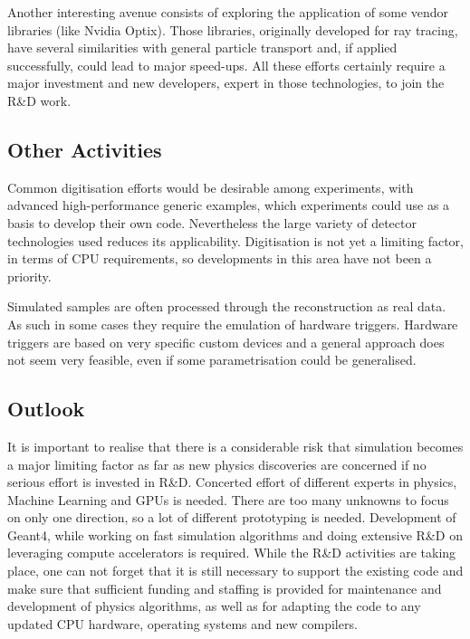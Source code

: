 Another interesting avenue consists of
exploring the application of some vendor libraries (like Nvidia Optix).
Those libraries, originally developed for ray tracing, have several
similarities with general particle transport and, if applied
successfully, could lead to major speed-ups. All these efforts certainly
require a major investment and new developers, expert in those
technologies, to join the R\&D work.

\hypertarget{other-activities}{%
\subsection{Other Activities}\label{other-activities}}

Common digitisation efforts would be desirable among experiments, with
advanced high-performance generic examples, which experiments could use
as a basis to develop their own code. Nevertheless the large variety of
detector technologies used reduces its
applicability. Digitisation is not yet a limiting factor, in terms of
CPU requirements, so developments in this area have not been a priority.

Simulated samples are often processed through the reconstruction as real
data. As such in some cases they require the emulation of hardware
triggers. Hardware triggers are based on very specific custom devices
and a general approach does not seem very feasible, even if some
parametrisation could be generalised.

\hypertarget{outlook}{%
\subsection{Outlook}\label{outlook}}

It is important to realise that there is a considerable
risk that simulation becomes a major limiting factor as far as new
physics discoveries are concerned if no serious effort is invested in
R\&D. Concerted effort of different experts in physics,
Machine Learning and GPUs is needed. There are too many unknowns to focus on only
one direction, so a lot of different prototyping is needed. Development of Geant4,
while working on fast simulation algorithms and
doing extensive R\&D on leveraging compute accelerators is required. While the R\&D
activities are taking place, one can not forget that it is still
necessary to support the existing code and make sure that sufficient
funding and staffing is provided for maintenance and development of
physics algorithms, as well as for adapting the code to any updated CPU
hardware, operating systems and new compilers.


